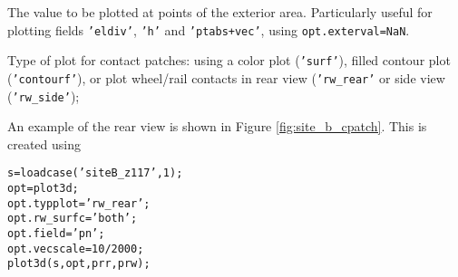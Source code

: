\documentclass[12pt]{report}
\begin{document}
\begin{description}[leftmargin=6em,style=nextline]
\item[exterval] The value to be plotted at points of the exterior area.
        Particularly useful for plotting fields {\tt 'eldiv'}, {\tt 'h'}
        and {\tt 'ptabs+vec'}, using {\tt opt.exterval=NaN}.
\item[typplot] Type of plot for contact patches: using a color plot
        ({\tt 'surf'}), filled contour plot ({\tt 'contourf'}), or plot
        wheel/rail contacts in rear view ({\tt 'rw\_rear'} or side view
        ({\tt 'rw\_side'});

An example of the rear view is shown in Figure \ref{fig:site_b_cpatch}. This
is created using
\begin{alltt}\small
  s = loadcase('siteB_z117',1);
  opt          = plot3d;
  opt.typplot  = 'rw_rear';
  opt.rw_surfc = 'both';
  opt.field    = 'pn';
  opt.vecscale = 10/2000; % mm/MPa
  plot3d( s, opt, prr, prw );
\end{alltt}


\end{description}
\end{document}
